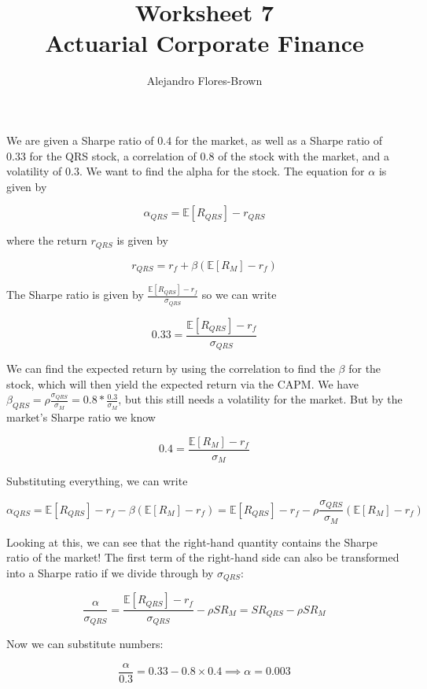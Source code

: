 \documentclass[12pt, letterpaper, parskip = full]{article}
\title{Worksheet 7 \\ Actuarial Corporate Finance}
\author{Alejandro Flores-Brown}
\newcommand{\Ex}[1]{\mathbb{E}\left[#1\right]}
\begin{document}
    \maketitle

    \section{}

    We are given a Sharpe ratio of \(0.4\) for the market, as well as a Sharpe ratio of \(0.33\) for the QRS stock, a correlation of \(0.8\) of the stock with the market, and a volatility of \(0.3\). We want to find the alpha for the stock. The equation for \(\alpha\) is given by
    
    \[ \alpha_{QRS} = \Ex{R_{QRS}} - r_{QRS} \]

    where the return \(r_{QRS}\) is given by 

    \[ r_{QRS} = r_f + \beta \left( \Ex{R_M} - r_f \right) \]

    The Sharpe ratio is given by \(\frac{\Ex{R_{QRS}} - r_f}{\sigma_{QRS}}\) so we can write

    \[ 0.33 = \frac{\Ex{R_{QRS}} - r_f}{\sigma_{QRS}}\]

    We can find the expected return by using the correlation to find the \(\beta\) for the stock, which will then yield the expected return via the CAPM. We have \(\beta_{QRS} = \rho \frac{\sigma_{QRS}}{\sigma_{M}} = 0.8 * \frac{0.3}{\sigma_M} \), but this still needs a volatility for the market. But by the market's Sharpe ratio we know 

    \[ 0.4 = \frac{\Ex{R_M} - r_f}{\sigma_M}  \]

    Substituting everything, we can write

    \[  \alpha_{QRS} = \Ex{R_{QRS}} - r_f - \beta \left( \Ex{R_M} - r_f \right) = \Ex{R_{QRS}} - r_f - \rho \frac{\sigma_{QRS}}{\sigma_M} (\Ex{R_M} - r_f)  \]

    Looking at this, we can see that the right-hand quantity contains the Sharpe ratio of the market! The first term of the right-hand side can also be transformed into a Sharpe ratio if we divide through by \(\sigma_{QRS}\):

    \[ \frac{\alpha}{\sigma_{QRS}} = \frac{\Ex{R_{QRS}} - r_f}{\sigma_{QRS}} - \rho SR_M = SR_{QRS} - \rho SR_M \]

    Now we can substitute numbers:

    \[ \frac{\alpha}{0.3} = 0.33 - 0.8 \times 0.4 \implies \boxed{\alpha = 0.003}   \]
\end{document}
